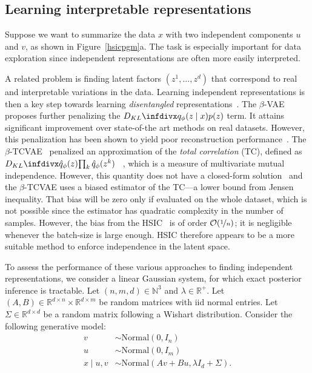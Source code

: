\subsection{Learning interpretable representations}
\label{hsicindep}
Suppose we want to summarize the data $x$ with two independent components $u$ and $v$, as shown in Figure~\ref{hsicpgm}a. The task is especially important for data exploration since independent representations are often more easily interpreted.

A related problem is finding latent factors $(z^1, ..., z^d)$ that correspond to real and interpretable variations in the data. Learning independent representations is then a key step towards learning \emph{disentangled} representations~\cite{betatcVAE, Higgins2017, Kim2018, Chen2016}.
The $\beta$-VAE~\cite{Higgins2017} proposes further penalizing the $\kld{q_\phi(z\mid x)}{p(z)}$ term. It attains significant improvement over state-of-the art methods on real datasets. However, this penalization has been shown to yield poor reconstruction performance~\cite{Burgess2018}. The $\beta$-TCVAE~\cite{betatcVAE} penalized an approximation of the \textit{total correlation} (TC), defined as  $\kld{\hat{q}_\phi(z)}{\prod_k \hat{q}_\phi(z^k)}$ ~\cite{Watanabe}, which is a measure of multivariate mutual independence. However, this quantity does not have a closed-form solution~\cite{Durrieu2012} and the $\beta$-TCVAE uses a biased estimator of the TC---a lower bound from Jensen inequality. That bias will be zero only if evaluated on the whole dataset, which is not possible since the estimator has quadratic complexity in the number of samples. However, the bias from the HSIC~\cite{HSIC} is of order $\mathcal{O}(\nicefrac{1}{n})$; it is negligible whenever the batch-size is large enough. HSIC therefore appears to be a more suitable method to enforce independence in the latent space.

To assess the performance of these various approaches to finding independent representations, we consider a linear Gaussian system, for which exact posterior inference is tractable. Let $(n, m, d) \in \mathbb{N}^3$ and $\lambda \in \mathbb{R}^+$. Let $(A, B) \in \mathbb{R}^{d\times n}\times\mathbb{R}^{d\times m}$ be random matrices with iid normal entries. Let $\Sigma \in \mathbb{R}^{d\times d}$ be a random matrix following a Wishart distribution. Consider the following generative model:
\begin{equation}
\begin{split}
v &\sim \textrm{Normal}(0, I_n) \\
u &\sim \textrm{Normal}(0, I_m) \\
x\mid u, v &\sim \textrm{Normal}(Av + Bu, \lambda I_d + \Sigma).
\end{split}
\end{equation}

